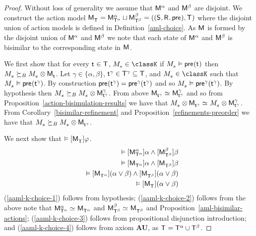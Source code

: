 \begin{proof}
Without loss of generality we assume that $\aModel[\alpha]$ and $\aModel[\beta]$ are disjoint.
We construct the action model $\aPModel{\aStatesT} = \aPModel[\alpha]{\aStatesT[\alpha]} \choice \aPModel[\beta]{\aStatesT[\beta]} = \aPModelTuple{\aStatesT}$ where the disjoint union of action models is defined in Definition~\ref{aml-choice}.  
As $\aModel$ is formed by the disjoint union of $\aModel[\alpha]$ and $\aModel[\beta]$ we note that each state of $\aModel[\alpha]$ and $\aModel[\beta]$ is bisimilar to the corresponding state in $\aModel$.

We first show that for every $\aStateT \in \aStatesT$, $\kPModel{\kStateS} \in \classK$ if $\kPModel{\kStateS} \entails \aPrecondition(\aStateT)$ then $\kPModel{\kStateS} \simulatesBs \kPModel{\kStateS} \exec \aPModel{\aStateT}$.
Let $\gamma \in \{\alpha, \beta\}$, $\aStateT[\gamma] \in \aStatesT[\gamma] \subseteq \aStatesT$, and $\kPModel{\kStateS} \in \classK$ such that $\kPModel{\kStateS} \entails \aPrecondition(\aStateT[\gamma])$.
By construction $\aPrecondition(\aStateT[\gamma]) = \aPrecondition[\gamma](\aStateT[\gamma])$ and so $\kPModel{\kStateS} \entails \aPrecondition[\gamma](\aStateT[\gamma])$. 
By hypothesis then $\kPModel{\kStateS} \simulatesBs \kPModel{\kStateS} \exec \aPModel[\gamma]{\aStateT[\gamma]}$.
From above $\aPModel{\aStateT[\gamma]} \bisimilar \aPModel[\gamma]{\aStateT[\gamma]}$ and so from Proposition~\ref{action-bisimulation-results} we have that $\kPModel{\kStateS} \exec \aPModel{\aStateT[\gamma]} \bisimilar \kPModel{\kStateS} \exec \aPModel[\gamma]{\aStateT[\gamma]}$.
From Corollary~\ref{bisimilar-refinement} and Proposition~\ref{refinements-preorder} we have that $\kPModel{\kStateS} \simulatesBs \kPModel{\kStateS} \exec \aPModel{\aStateT[\gamma]}$.

We next show that $\entails \actionA{\aPModel{\aStatesT}} \phi$.
\begin{eqnarray}
    &&\entails \actionA{\aPModel[\alpha]{\aStatesT[\alpha]}} \alpha \land \actionA{\aPModel[\beta]{\aStatesT[\beta]}} \beta \label{aaml-k-choice-1}\\
    &&\entails \actionA{\aPModel{\aStatesT[\alpha]}} \alpha \land \actionA{\aPModel{\aStatesT[\beta]}} \beta \label{aaml-k-choice-2}\\
    &&\entails \actionA{\aPModel{\aStatesT[\alpha]}} (\alpha \lor \beta) \land \actionA{\aPModel{\aStatesT[\beta]}} (\alpha \lor \beta) \label{aaml-k-choice-3}\\
    &&\entails \actionA{\aPModel{\aStatesT}} (\alpha \lor \beta) \label{aaml-k-choice-4}
\end{eqnarray}
(\ref{aaml-k-choice-1}) follows from hypothesis;
(\ref{aaml-k-choice-2}) follows from the above note that $\aPModel[\alpha]{\aStatesT[\alpha]} \bisimilar \aPModel{\aStatesT[\alpha]}$ and $\aPModel[\beta]{\aStatesT[\beta]} \bisimilar \aPModel{\aStatesT[\beta]}$ and Proposition~\ref{aml-bisimilar-actions};
(\ref{aaml-k-choice-3}) follows from propositional disjunction introduction; and
(\ref{aaml-k-choice-4}) follows from \axiomAamlK{} axiom {\bf AU}, as $\aStatesT = \aStatesT[\alpha] \cup \aStatesT[\beta]$.


\end{proof}
